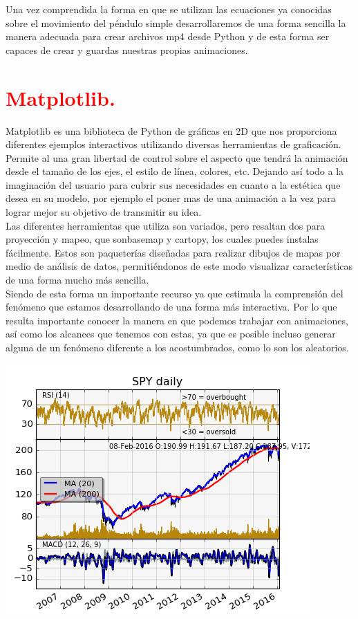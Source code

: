 \documentclass[12pt]{article}
\begin{document}
Una vez comprendida la forma en que se utilizan las ecuaciones ya conocidas sobre el movimiento del péndulo simple desarrollaremos de una forma sencilla la manera adecuada para crear archivos mp4 desde Python y de esta forma ser capaces de crear y guardas nuestras propias animaciones. 
 
\section*{\textcolor{Red}{Matplotlib.}}
Matplotlib es una biblioteca de Python de gráficas en 2D que nos proporciona diferentes ejemplos interactivos utilizando diversas herramientas de graficación.\\

Permite al una gran libertad de control sobre el aspecto que tendrá la animación desde el tamaño de los ejes, el estilo de línea, colores, etc. Dejando así todo a la imaginación del usuario para cubrir sus necesidades en cuanto a la estética que desea en su modelo, por ejemplo el poner mas de una animación a la vez para lograr mejor su objetivo de transmitir su idea.\\

Las diferentes herramientas que utiliza son variados, pero resaltan dos para proyección y mapeo, que sonbasemap y cartopy, los cuales puedes instalas fácilmente. Estos son paqueterías diseñadas para realizar dibujos de mapas por medio de análisis de datos, permitiéndonos de este modo visualizar características de una forma mucho más sencilla.\\

Siendo de esta forma un importante recurso ya que estimula la comprensión del fenómeno que estamos desarrollando de una forma más interactiva. Por lo que resulta importante conocer la manera en que podemos trabajar con animaciones, así como los alcances que tenemos con estas, ya que es posible incluso generar alguna de un fenómeno diferente a los acostumbrados, como lo son los aleatorios.

\includegraphics[scale=0.8]{Act10.png}
\end{document}
